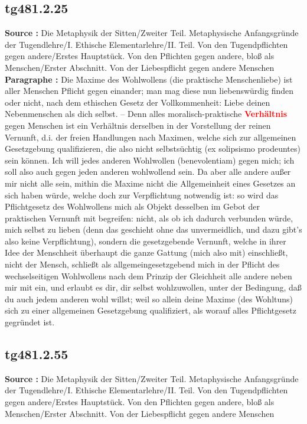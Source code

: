 \documentclass[a4paper,12pt,twoside]{book}
\newcommand{\match}[1]{\textcolor{red}{\textbf{#1}}}
\begin{document}
	\subsection*{tg481.2.25} 
	\textbf{Source : }Die Metaphysik der Sitten/Zweiter Teil. Metaphysische Anfangsgründe der Tugendlehre/I. Ethische Elementarlehre/II. Teil. Von den Tugendpflichten gegen andere/Erstes Hauptstück. Von den Pflichten gegen andere, bloß als Menschen/Erster Abschnitt. Von der Liebespflicht gegen andere Menschen\\  
	
	\textbf{Paragraphe : }Die Maxime des Wohlwollens (die praktische Menschenliebe) ist aller Menschen Pflicht gegen einander; man mag diese nun liebenswürdig finden oder nicht, nach dem ethischen Gesetz der Vollkommenheit: Liebe deinen Nebenmenschen als dich selbst. – Denn alles moralisch-praktische \match{Verhältnis} gegen Menschen ist ein Verhältnis derselben in der Vorstellung der reinen Vernunft, d.i. der freien Handlungen nach Maximen, welche sich zur allgemeinen Gesetzgebung qualifizieren, die also nicht selbstsüchtig (ex solipsismo prodeuntes) sein können. Ich will jedes anderen Wohlwollen (benevolentiam) gegen mich; ich soll also auch gegen jeden anderen wohlwollend sein. Da aber alle andere außer mir nicht alle sein, mithin die Maxime nicht die Allgemeinheit eines Gesetzes an sich haben würde, welche doch zur Verpflichtung notwendig ist: so wird das Pflichtgesetz des Wohlwollens mich als Objekt desselben im Gebot der praktischen Vernunft mit begreifen: nicht, als ob ich dadurch verbunden würde, mich selbst zu lieben (denn das geschieht ohne das unvermeidlich, und dazu gibt's also keine Verpflichtung), sondern die gesetzgebende Vernunft, welche in ihrer Idee der Menschheit überhaupt die ganze Gattung (mich also mit) einschließt, nicht der Mensch, schließt als allgemeingesetzgebend mich in der Pflicht des wechselseitigen Wohlwollens nach dem Prinzip der Gleichheit alle andere neben mir mit ein, und erlaubt es dir, dir selbst wohlzuwollen, unter der Bedingung, daß du auch jedem anderen wohl willst; weil so allein deine Maxime (des Wohltuns) sich zu einer allgemeinen Gesetzgebung qualifiziert, als worauf alles Pflichtgesetz gegründet ist. 
	
	\subsection*{tg481.2.55} 
	\textbf{Source : }Die Metaphysik der Sitten/Zweiter Teil. Metaphysische Anfangsgründe der Tugendlehre/I. Ethische Elementarlehre/II. Teil. Von den Tugendpflichten gegen andere/Erstes Hauptstück. Von den Pflichten gegen andere, bloß als Menschen/Erster Abschnitt. Von der Liebespflicht gegen andere Menschen\\  
	
\end{document}
